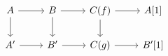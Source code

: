 \documentclass[12pt]{standalone}
\begin{document}
        $$

\begin{tikzcd}
    A \ar[r] \ar[d] & B \ar[d] \ar[r] & C(f) \ar[r] \ar[d] & A[1] \\
    A^\prime \ar[r] & B^\prime \ar[r] & C(g) \ar[r] & B^\prime[1]
\end{tikzcd}
        $$
        
\end{document}
